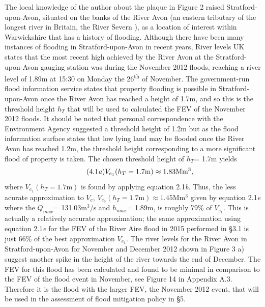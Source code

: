 \documentclass[11pt,a4paper]{article}
\begin{document}
The local knowledge of the author about the plaque in Figure 2 raised Stratford-upon-Avon, situated on the banks of the River Avon (an eastern tributary of the longest river in Britain, the River Severn \cite{britannica}), as a location of interest within Warwickshire that has a history of flooding. Although there have been many instances of flooding in Stratford-upon-Avon in recent years, River levels UK \cite{recent-high} states that the most recent high achieved by the River Avon at the Stratford-upon-Avon gauging station was during the November 2012 floods, reaching a river level of 1.89m at 15:30 on Monday the 26\textsuperscript{th} of November. The government-run flood information service \cite{ht} states that property flooding is possible in Stratford-upon-Avon once the River Avon has reached a height of 1.7m, and so this is the threshold height $h_T$ that will be used to calculated the FEV of the November 2012 floods. It should be noted that personal correspondence with the Environment Agency \cite{EA} suggested a threshold height of 1.2m but as the flood information surface states that low lying land may be flooded once the River Avon has reached 1.2m, the threshold height corresponding to a more significant flood of property is taken. The chosen threshold height of $h_T$= 1.7m yields
\begin{equation}\tag{4.1\textit{a}}
V_{e_1}(h_T=\text{1.7m})\approx 1.83\text{Mm$^3$},
\end{equation}
where $V_{e_1}(h_T=\text{1.7m})$ is found by applying equation 2.1\textit{b}. Thus, the less acurate approximation to $V_e$, $V_{e_3}(h_T=\text{1.7m})\approx 1.45\text{Mm$^3$}$ given by equation 2.1\textit{e} where the $Q_{max}$= 131.03m$^3$/s and $h_{max}$= 1.89m, is roughly 79\% of $V_{e_1}$. This is actually a relatively accurate approximation{;} the same approximation using equation 2.1\textit{e} for the FEV of the River Aire flood in 2015 performed in \S 3.1 is just 66\% of the best approximation $V_{e_1}$. The river levels for the River Avon in Stratford-upon-Avon for November and December 2012 shown in Figure 3 a) suggest another spike in the height of the river towards the end of December. The FEV for this flood has been calculated and found to be minimal in comparison to the FEV of the flood event in November, see Figure 14 in Appendix A.3. Therefore it is the flood with the larger FEV, the November 2012 event, that will be used in the assessment of flood mitigation policy in \S 5.
\end{document}
